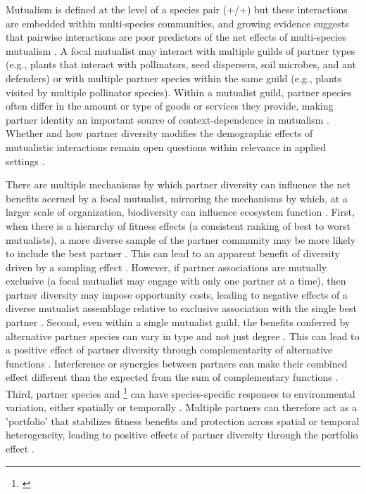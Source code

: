 \documentclass[11pt]{article}
\newcommand{\tom}[2]{{\color{red}{#1}}\footnote{\textit{\color{red}{#2}}}}
\begin{document}
Mutualism is defined at the level of a species pair (+/+) but these interactions are embedded within multi-species communities, and growing evidence suggests that pairwise interactions are poor predictors of the net effects of multi-species mutualism \citep{Afkhami2014,Palmer2010,Bascompte2009,Dattilo2014}. 
A focal mutualist may interact with multiple guilds of partner types (e.g., plants that interact with pollinators, seed dispersers, soil microbes, and ant defenders) or with multiple partner species within the same guild (e.g., plants visited by multiple pollinator species). 
Within a mutualist guild, partner species often differ in the amount or type of goods or services they provide, making partner identity an important source of context-dependence in mutualism \citep{Stanton2003}. 
Whether and how partner diversity modifies the demographic effects of mutualistic interactions remain open questions within relevance in applied settings \citep{rogers2014}. 

There are multiple mechanisms by which partner diversity can influence the net benefits accrued by a focal mutualist, mirroring the mechanisms by which, at a larger scale of organization, biodiversity can influence ecosystem function \cite{Yeung2006,Barrett2015,Ushio2020}. 
First, when there is a hierarchy of fitness effects (a consistent ranking of best to worst mutualists), a more diverse sample of the partner community may be more likely to include the best partner \cite{Frederickson2013}.
This can lead to an apparent benefit of diversity driven by a sampling effect \cite{Batstone2018}. 
However, if partner associations are mutually exclusive (a focal mutualist may engage with only one partner at a time), then partner diversity may impose opportunity costs, leading to negative effects of a diverse mutualist assemblage relative to exclusive association with the single best partner \citep{Miller2007}. 
Second, even within a single mutualist guild, the benefits conferred by alternative partner species can vary in type and not just degree \cite{Stachowicz2005,Bronstein2006,Stanton2003}. 
This can lead to a positive effect of partner diversity through complementarity of alternative functions \cite{Batstone2018}. 
Interference or synergies between partners can make their combined effect different than the expected from the sum of complementary functions \cite{Afkhami2014}. 
Third, partner species and \tom{herbivores}{notice that ``herbiviores'' does not fit here, at least not yet. you have not said anything about ants and plants, you are talking very generally. put yourself in the mind of a reader as you write, this will help ensure that ideas appear in an order that can be digested.} can have species-specific responses to environmental variation, either spatially \citep{Ollerton2006} or temporally \citep{Alarcon2008}. 
Multiple partners can therefore act as a 'portfolio' that stabilizes fitness benefits and protection across spatial or temporal heterogeneity, leading to positive effects of partner diversity through the portfolio effect \cite{Batstone2018,Lazaro2022,Horvitz1990}. 
\end{document}
